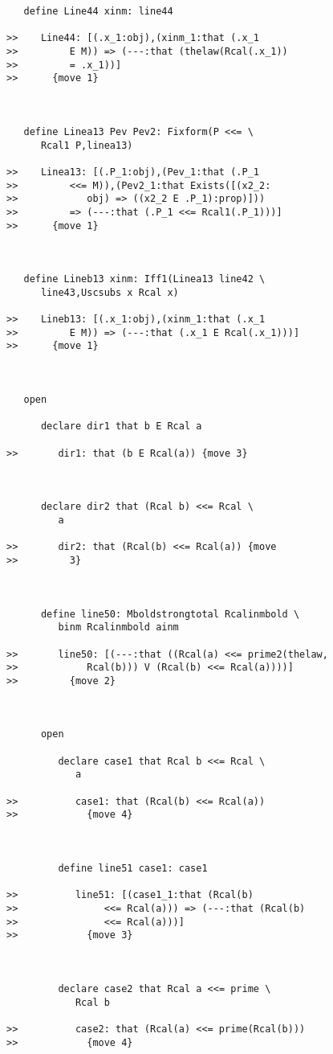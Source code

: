 \documentclass[12pt]{article}
\begin{document}
\begin{verbatim}
   define Line44 xinm: line44

>>    Line44: [(.x_1:obj),(xinm_1:that (.x_1
>>         E M)) => (---:that (thelaw(Rcal(.x_1))
>>         = .x_1))]
>>      {move 1}



   define Linea13 Pev Pev2: Fixform(P <<= \
      Rcal1 P,linea13)

>>    Linea13: [(.P_1:obj),(Pev_1:that (.P_1
>>         <<= M)),(Pev2_1:that Exists([(x2_2:
>>            obj) => ((x2_2 E .P_1):prop)]))
>>         => (---:that (.P_1 <<= Rcal1(.P_1)))]
>>      {move 1}



   define Lineb13 xinm: Iff1(Linea13 line42 \
      line43,Uscsubs x Rcal x)

>>    Lineb13: [(.x_1:obj),(xinm_1:that (.x_1
>>         E M)) => (---:that (.x_1 E Rcal(.x_1)))]
>>      {move 1}



   open

      declare dir1 that b E Rcal a

>>       dir1: that (b E Rcal(a)) {move 3}



      declare dir2 that (Rcal b) <<= Rcal \
         a

>>       dir2: that (Rcal(b) <<= Rcal(a)) {move
>>         3}



      define line50: Mboldstrongtotal Rcalinmbold \
         binm Rcalinmbold ainm

>>       line50: [(---:that ((Rcal(a) <<= prime2(thelaw,
>>            Rcal(b))) V (Rcal(b) <<= Rcal(a))))]
>>         {move 2}



      open

         declare case1 that Rcal b <<= Rcal \
            a

>>          case1: that (Rcal(b) <<= Rcal(a))
>>            {move 4}



         define line51 case1: case1

>>          line51: [(case1_1:that (Rcal(b)
>>               <<= Rcal(a))) => (---:that (Rcal(b)
>>               <<= Rcal(a)))]
>>            {move 3}



         declare case2 that Rcal a <<= prime \
            Rcal b

>>          case2: that (Rcal(a) <<= prime(Rcal(b)))
>>            {move 4}




\end{verbatim}
\end{document}
